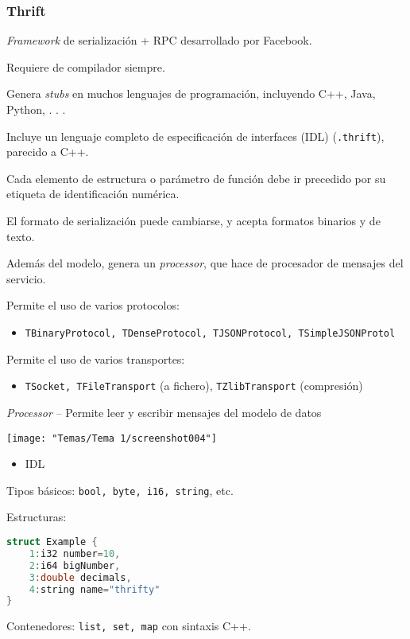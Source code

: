 \subsubsection{Thrift}
\textit{Framework} de serialización + RPC desarrollado por Facebook.

Requiere de compilador siempre.

Genera \textit{stubs} en muchos lenguajes de programación, incluyendo C++, Java, Python, . . .

Incluye un lenguaje completo de especificación de interfaces (IDL) (\texttt{.thrift}), parecido a C++.

Cada elemento de estructura o parámetro de función debe ir precedido por su etiqueta de identificación numérica.

El formato de serialización puede cambiarse, y acepta formatos binarios y de texto.

Además del modelo, genera un \textit{processor}, que hace de procesador de mensajes del servicio.

\begin{minipage}{0.45\textwidth}
	Permite el uso de varios protocolos:
	\begin{itemize}
		\item \texttt{TBinaryProtocol, TDenseProtocol, TJSONProtocol, TSimpleJSONProtol}
	\end{itemize}
	Permite el uso de varios transportes:
	\begin{itemize}
		\item \texttt{TSocket, TFileTransport} (a fichero), \texttt{TZlibTransport} (compresión)
	\end{itemize}
	\textit{Processor} – Permite leer y escribir mensajes del modelo de datos
\end{minipage}\qquad\begin{minipage}{0.45\textwidth}
\begin{center}
	\texttt{[image: "Temas/Tema 1/screenshot004"]}
\end{center}
\end{minipage}
\begin{itemize}[label=\color{red}\textbullet, leftmargin=*]
	\item \color{lightblue}IDL
\end{itemize}
Tipos básicos: \texttt{bool, byte, i16, string}, etc.

Estructuras:
\begin{lstlisting}[language=C++]
struct Example {
	1:i32 number=10,
	2:i64 bigNumber,
	3:double decimals,
	4:string name="thrifty"
}
\end{lstlisting}
Contenedores: \texttt{list, set, map} con sintaxis C++.

